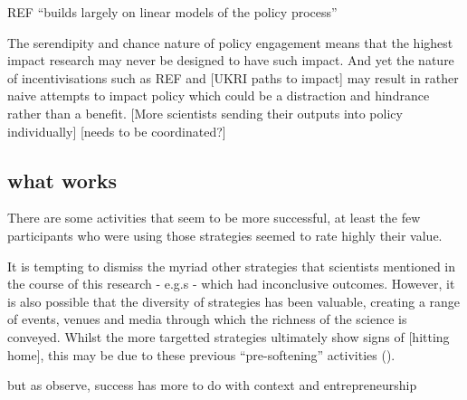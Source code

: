 REF ``builds largely on linear models of the policy process'' \cite{CairneyO2020}

The serendipity and chance nature of policy engagement means that the highest impact research may never be designed to have such impact. And yet the nature of incentivisations such as REF and [UKRI paths to impact] may result in rather naive attempts to impact policy which could be a distraction and hindrance rather than a benefit. [More scientists sending their outputs into policy individually] [needs to be coordinated?]

\subsection{what works}
There are some activities that seem to be more successful, at least the few participants who were using those strategies seemed to rate highly their value. 

It is tempting to dismiss the myriad other strategies that scientists mentioned in the course of this research - e.g.s - which had inconclusive outcomes. However, it is also possible that the diversity of strategies has been valuable, creating a range of events, venues and media through which the richness of the science is conveyed. Whilst the more targetted strategies ultimately show signs of [hitting home], this may be due to these previous ``pre-softening'' activities (\cite{Cairney2018}).

but as \textcite{CairneyO2020} observe, success has more to do with context and entrepreneurship
